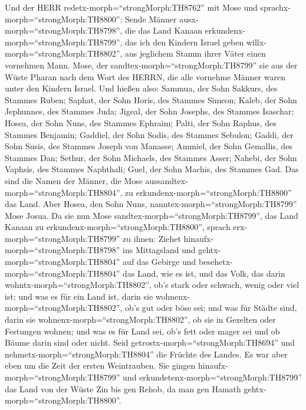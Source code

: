  Und der HERR redetx-morph=``strongMorph:TH8762'' mit Mose
und sprachx-morph=``strongMorph:TH8800'':  Sende Männer
ausx-morph=``strongMorph:TH8798'', die das Land Kanaan
erkundenx-morph=``strongMorph:TH8799'', das ich den Kindern Israel geben
willx-morph=``strongMorph:TH8802'', aus jeglichem Stamm ihrer Väter
einen vornehmen Mann.  Mose, der
sandtex-morph=``strongMorph:TH8799'' sie aus der Wüste Pharan nach dem
Wort des HERRN, die alle vornehme Männer waren unter den Kindern Israel.
 Und hießen also: Sammua, der Sohn Sakkurs, des Stammes
Ruben;  Saphat, der Sohn Horis, des Stammes Simeon;
 Kaleb, der Sohn Jephunnes, des Stammes Juda; 
Jigeal, der Sohn Josephs, des Stammes Isaschar;  Hosea, der
Sohn Nuns, des Stammes Ephraim;  Palti, der Sohn Raphus, des
Stammes Benjamin;  Gaddiel, der Sohn Sodis, des Stammes
Sebulon;  Gaddi, der Sohn Susis, des Stammes Joseph von
Manasse;  Ammiel, der Sohn Gemallis, des Stammes Dan;
 Sethur, der Sohn Michaels, des Stammes Asser;
 Nahebi, der Sohn Vaphsis, des Stammes Naphthali;
 Guel, der Sohn Machis, des Stammes Gad.  Das
sind die Namen der Männer, die Mose
aussandtex-morph=``strongMorph:TH8804'', zu
erkundenx-morph=``strongMorph:TH8800'' das Land. Aber Hosea, den Sohn
Nuns, nanntex-morph=``strongMorph:TH8799'' Mose Josua.  Da
sie nun Mose sandtex-morph=``strongMorph:TH8799'', das Land Kanaan zu
erkundenx-morph=``strongMorph:TH8800'', sprach
erx-morph=``strongMorph:TH8799'' zu ihnen: Ziehet
hinaufx-morph=``strongMorph:TH8798'' ins Mittagsland und
gehtx-morph=``strongMorph:TH8804'' auf das Gebirge  und
besehetx-morph=``strongMorph:TH8804'' das Land, wie es ist, und das
Volk, das darin wohntx-morph=``strongMorph:TH8802'', ob's stark oder
schwach, wenig oder viel ist;  und was es für ein Land ist,
darin sie wohnenx-morph=``strongMorph:TH8802'', ob's gut oder böse sei;
und was für Städte sind, darin sie wohnenx-morph=``strongMorph:TH8802'',
ob sie in Gezelten oder Festungen wohnen;  und was es für
Land sei, ob's fett oder mager sei und ob Bäume darin sind oder nicht.
Seid getrostx-morph=``strongMorph:TH8694'' und
nehmetx-morph=``strongMorph:TH8804'' die Früchte des Landes. Es war aber
eben um die Zeit der ersten Weintrauben.  Sie gingen
hinaufx-morph=``strongMorph:TH8799'' und
erkundetenx-morph=``strongMorph:TH8799'' das Land von der Wüste Zin bis
gen Rehob, da man gen Hamath gehtx-morph=``strongMorph:TH8800''.
